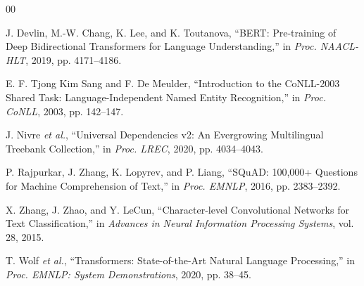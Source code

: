 \documentclass[conference]{IEEEtran}
\begin{document}
\begin{thebibliography}{00}

J. Devlin, M.-W. Chang, K. Lee, and K. Toutanova,
``BERT: Pre-training of Deep Bidirectional Transformers for Language Understanding,''
in \emph{Proc. NAACL-HLT}, 2019, pp. 4171--4186.

E. F. Tjong Kim Sang and F. De Meulder,
``Introduction to the CoNLL-2003 Shared Task: Language-Independent Named Entity Recognition,''
in \emph{Proc. CoNLL}, 2003, pp. 142--147.

J. Nivre \emph{et al.},
``Universal Dependencies v2: An Evergrowing Multilingual Treebank Collection,''
in \emph{Proc. LREC}, 2020, pp. 4034--4043.

P. Rajpurkar, J. Zhang, K. Lopyrev, and P. Liang,
``SQuAD: 100,000+ Questions for Machine Comprehension of Text,''
in \emph{Proc. EMNLP}, 2016, pp. 2383--2392.

X. Zhang, J. Zhao, and Y. LeCun,
``Character-level Convolutional Networks for Text Classification,''
in \emph{Advances in Neural Information Processing Systems}, vol. 28, 2015.

T. Wolf \emph{et al.},
``Transformers: State-of-the-Art Natural Language Processing,''
in \emph{Proc. EMNLP: System Demonstrations}, 2020, pp. 38--45.

\end{thebibliography}
\end{document}
